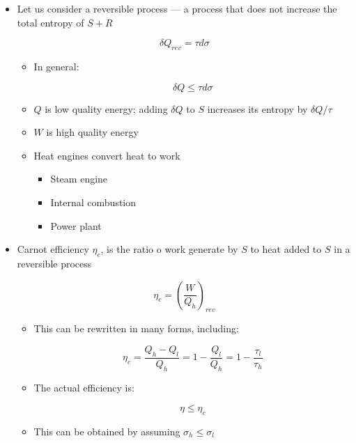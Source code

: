 \begin{itemize}
  \item Let us consider a reversible process — a process that does not increase the total entropy of $S+R$

    $$\delta Q_{rev}=\tau d\sigma$$

    \begin{itemize}

      \item In general:

        $$\delta Q\leq \tau d\sigma$$

      \item $Q$ is low quality energy; adding $\delta Q$ to $S$ increases its entropy by $\delta Q/\tau$

      \item $W$ is high quality energy

      \item Heat engines convert heat to work

        \begin{itemize}

          \item Steam engine
            
          \item Internal combustion

          \item Power plant

        \end{itemize}

    \end{itemize}

  \item Carnot efficiency $\eta_c$, is the ratio o work generate by $S$ to heat added to $S$ in a reversible process

    $$\eta_c=\left( \frac{W}{Q_h} \right)_{rev}$$

    \begin{itemize}

      \item This can be rewritten in many forms, including:

        $$\eta_c=\frac{Q_h-Q_l}{Q_h}=1-\frac{Q_l}{Q_h}=1-\frac{\tau_l}{\tau_h}$$

      \item The actual efficiency is:

        $$\eta\leq\eta_c$$

      \item This can be obtained by assuming $\sigma_h\leq\sigma_l$


\end{itemize}
\end{itemize}
